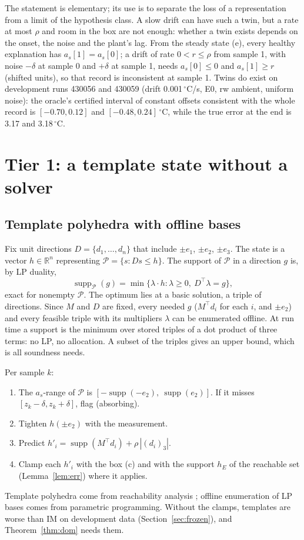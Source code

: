 \documentclass[11pt,a4paper]{article}
\newcommand{\degC}{\ensuremath{{}^\circ}C}
\newcommand{\R}{\mathbb{R}}
\begin{document}
The statement is elementary; its use is to separate the loss of a representation from a limit of the hypothesis
class. A slow drift can have such a twin, but a rate at most $\rho$ and room in the box are not enough: whether a twin
exists depends on the onset, the noise and the plant's lag. From the steady state (e), every healthy explanation has
$a_s[1] = a_s[0]$; a drift of rate $0<r\le\rho$ from sample 1, with noise $-\delta$ at sample 0 and $+\delta$ at sample
1, needs $a_s[0]\le0$ and $a_s[1]\ge r$ (shifted units), so that record is inconsistent at sample 1. Twins do exist on
development runs 430056 and 430059 (drift 0.001\,\degC/s, E0, rw ambient, uniform noise): the oracle's certified
interval of constant offsets consistent with the whole record is $[-0.70, 0.12]$ and $[-0.48, 0.24]$\,\degC, while the true error at the end is 3.17 and 3.18\,\degC.

\section{Tier 1: a template state without a solver}

\subsection{Template polyhedra with offline bases}

Fix unit directions $D = \{d_1,\dots,d_n\}$ that include $\pm e_1$, $\pm e_2$, $\pm e_3$. The state is a vector
$h\in\R^n$ representing $\mathcal{P} = \{s : Ds\le h\}$. The support of $\mathcal{P}$ in a direction $g$ is, by LP
duality,
\[
\operatorname{supp}_{\mathcal{P}}(g) = \min\{\lambda\cdot h : \lambda\ge0,\ D^\top\lambda = g\},
\]
exact for nonempty $\mathcal{P}$. The optimum lies at a basic solution, a triple of directions. Since $M$ and $D$ are
fixed, every needed $g$ ($M^\top d_i$ for each $i$, and $\pm e_2$) and every feasible triple with its multipliers
$\lambda$ can be enumerated offline. At run time a support is the minimum over stored triples of a dot product of three
terms: no LP, no allocation. A subset of the triples gives an upper bound, which is all soundness needs.

Per sample $k$:
\begin{enumerate}
\item The $a_s$-range of $\mathcal{P}$ is $[-\operatorname{supp}(-e_2),\ \operatorname{supp}(e_2)]$. If it misses
  $[z_k-\delta, z_k+\delta]$, flag (absorbing).
\item Tighten $h(\pm e_2)$ with the measurement.
\item Predict $h'_i = \operatorname{supp}(M^\top d_i) + \rho\,|(d_i)_3|$.
\item Clamp each $h'_i$ with the box (c) and with the support $h_E$ of the reachable set (Lemma~\ref{lem:err}) where it
  applies.
\end{enumerate}
Template polyhedra come from reachability analysis \citep{sankaranarayanan2008}; offline enumeration of LP bases comes
from parametric programming. Without the clamps, templates are worse than IM on development data
(Section~\ref{sec:frozen}), and Theorem~\ref{thm:dom} needs them.
\end{document}
